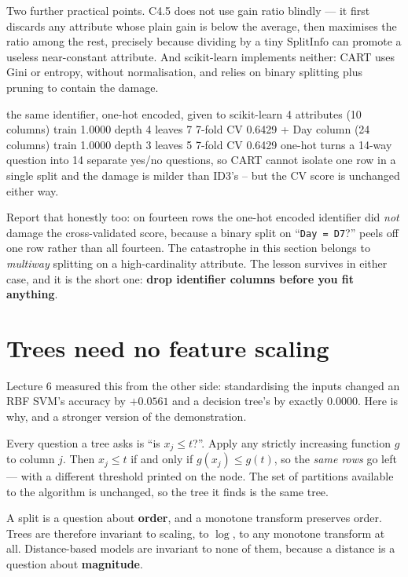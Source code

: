 \documentclass[11pt]{article}
\begin{document}
Two further practical points. C4.5 does not use gain ratio blindly --- it
first discards any attribute whose plain gain is below the average, then
maximises the ratio among the rest, precisely because dividing by a tiny
$\mathrm{SplitInfo}$ can promote a useless near-constant attribute. And
scikit-learn implements neither: CART uses Gini or entropy, without
normalisation, and relies on binary splitting plus pruning to contain the
damage.

\begin{codeout}
the same identifier, one-hot encoded, given to scikit-learn
   4 attributes  (10 columns)     train 1.0000  depth 4  leaves 7  7-fold CV 0.6429
   + Day column  (24 columns)     train 1.0000  depth 3  leaves 5  7-fold CV 0.6429
   one-hot turns a 14-way question into 14 separate yes/no questions,
   so CART cannot isolate one row in a single split and the damage is
   milder than ID3's -- but the CV score is unchanged either way.
\end{codeout}

Report that honestly too: on fourteen rows the one-hot encoded identifier did
\emph{not} damage the cross-validated score, because a binary split on
``\texttt{Day = D7}?'' peels off one row rather than all fourteen. The
catastrophe in this section belongs to \emph{multiway} splitting on a
high-cardinality attribute. The lesson survives in either case, and it is the
short one: \textbf{drop identifier columns before you fit anything}.

\notesources{\AMLUnitVISources}

\section{Trees need no feature scaling}
\label{sec:scale}

Lecture 6 measured this from the other side: standardising the inputs changed
an RBF SVM's accuracy by $+0.0561$ and a decision tree's by exactly $0.0000$.
Here is why, and a stronger version of the demonstration.

Every question a tree asks is ``is $x_j \le t$?''. Apply any strictly
increasing function $g$ to column $j$. Then $x_j \le t$ if and only if
$g(x_j) \le g(t)$, so the \emph{same rows} go left --- with a different
threshold printed on the node. The set of partitions available to the
algorithm is unchanged, so the tree it finds is the same tree.

\begin{keyidea}
A split is a question about \textbf{order}, and a monotone transform preserves
order. Trees are therefore invariant to scaling, to $\log$, to any monotone
transform at all. Distance-based models are invariant to none of them, because
a distance is a question about \textbf{magnitude}.
\end{keyidea}
\end{document}
